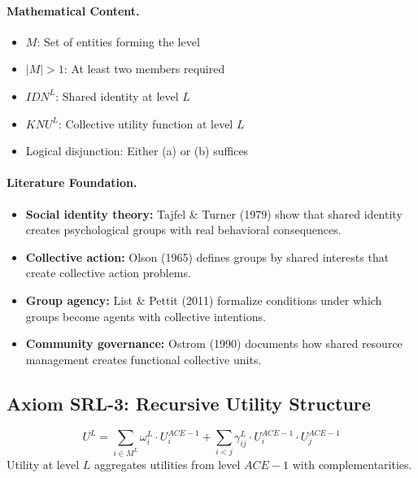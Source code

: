 \paragraph{Mathematical Content.}
\begin{itemize}
\item $M$: Set of entities forming the level
\item $|M| > 1$: At least two members required
\item $IDN^L$: Shared identity at level $L$
\item $KNU^L$: Collective utility function at level $L$
\item Logical disjunction: Either (a) or (b) suffices
\end{itemize}

\paragraph{Literature Foundation.}
\begin{itemize}
\item \textbf{Social identity theory:} Tajfel \& Turner (1979) show that shared 
identity creates psychological groups with real behavioral consequences.
\item \textbf{Collective action:} Olson (1965) defines groups by shared interests 
that create collective action problems.
\item \textbf{Group agency:} List \& Pettit (2011) formalize conditions under 
which groups become agents with collective intentions.
\item \textbf{Community governance:} Ostrom (1990) documents how shared resource 
management creates functional collective units.
\end{itemize}

\subsection{Axiom SRL-3: Recursive Utility Structure}

\begin{tcolorbox}[colback=gray!5!white, colframe=gray!75!black, title=Axiom SRL-3: Recursive Structure]
\begin{equation}
\boxed{
U^L = \sum_{i \in M^L} \omega^L_i \cdot U^{ACE-1}_i + \sum_{i < j} \gamma^L_{ij} \cdot U^{ACE-1}_i \cdot U^{ACE-1}_j
}
\end{equation}
Utility at level $L$ aggregates utilities from level $ACE-1$ with complementarities.
\end{tcolorbox}

